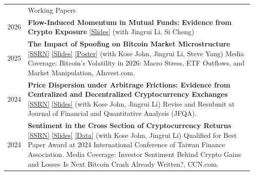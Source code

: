\documentclass[letterpaper, 11pt]{article}
\newcommand{\headingfont}{\Large\color{OliveGreen}}
\newenvironment{SectionTable}[1]{
	\renewcommand*{\arraystretch}{1.55}
	\setlength{\tabcolsep}{10pt}
	\begin{longtable}{Rp{5.45in}} & #1 \\}
{\end{longtable}\vspace{-.3cm}}
\begin{document}

\begin{SectionTable}{\headingfont Working Papers}

2026 &
\textbf{Flow-Induced Momentum in Mutual Funds: Evidence from Crypto Exposure}
\href{https://ronming1303.github.io/documents/Crypto_Mutual_Fund_Slide.pdf}{[Slides]} \newline
(with Jingrui Li, Si Cheng) \\

2025 & 
\textbf{The Impact of Spoofing on Bitcoin Market
Microstructure}
\href{https://papers.ssrn.com/sol3/papers.cfm?abstract_id=5771502}{[SSRN]}
\href{https://ronming1303.github.io/documents/CryptoSpoofSWUFE061626.pdf}{[Slides]}
\href{https://ronming1303.github.io/documents/spoofing_poster.pdf}{[Poster]} \newline
(with Kose John, Jingrui Li, Steve Yang) \newline
Media Coverage: Bitcoin's Volatility in 2026: Macro Stress, ETF Outflows, and Market Manipulation, AInvest.com. \\


2024 &
\textbf{Price Dispersion under Arbitrage Frictions: Evidence from Centralized and Decentralized Cryptocurrency Exchanges}
\href{https://papers.ssrn.com/sol3/papers.cfm?abstract_id=4816710}{[SSRN]}
\href{https://ronming1303.github.io/documents/CryptoExchangeArbitrage.pdf}{[Slides]} \newline
(with Kose John, Jingrui Li) \newline
Revise and Resubmit at Journal of Financial and Quantitative Analysis (JFQA). \\


2024 & 
\textbf{Sentiment in the Cross Section of Cryptocurrency Returns}
\href{https://papers.ssrn.com/sol3/papers.cfm?abstract_id=4941032}{[SSRN]}
\href{https://ronming1303.github.io/documents/CryptoSentiment_FMA2024.pdf}{[Slides]}
\href{https://github.com/ronming1303/CryptoSent/tree/main}{[Data]} \newline
(with Kose John, Jingrui Li) \newline
{Qualified for Best Paper Award at 2024 International Conference of Taiwan Finance Association}. \newline
{Media Coverage: Investor Sentiment Behind Crypto Gains and Losses--Is Next Bitcoin Crash Already Written?, CCN.com}.
\end{SectionTable}

\end{document}
